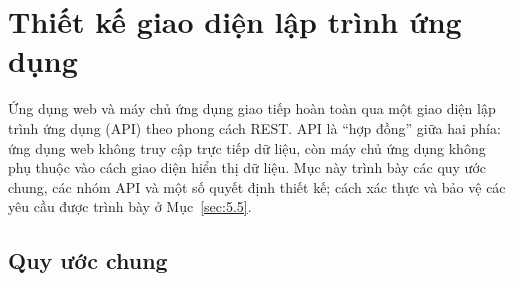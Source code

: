 \section{Thiết kế giao diện lập trình ứng dụng}
\label{sec:5.4}

Ứng dụng web và máy chủ ứng dụng giao tiếp hoàn toàn qua một giao diện lập trình ứng dụng (API) theo phong cách REST. API là ``hợp đồng'' giữa hai phía: ứng dụng web không truy cập trực tiếp dữ liệu, còn máy chủ ứng dụng không phụ thuộc vào cách giao diện hiển thị dữ liệu. Mục này trình bày các quy ước chung, các nhóm API và một số quyết định thiết kế; cách xác thực và bảo vệ các yêu cầu được trình bày ở Mục~\ref{sec:5.5}.

\subsection{Quy ước chung}
\label{sec:5.4.1}

